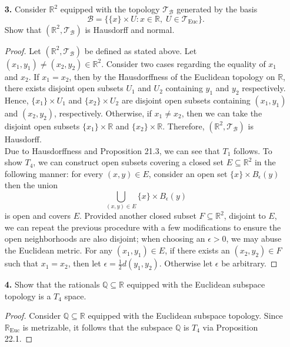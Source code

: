 \documentclass[ 12pt ]{article}
\begin{document}
\begin{enumerate}
	\item[\textbf{3.}] Consider $\mathbb{R}^2$ equipped with the topology $\mathcal{T}_\mathcal{B}$ generated by the basis $$\mathcal{B} = \{ \{ x \} \times U : x \in \mathbb{R},\; U \in
		\mathcal{T}_\mathrm{Euc} \}.$$ Show that $(\mathbb{R}^2, \mathcal{T}_\mathcal{B})$ is Hausdorff and normal.

		\begin{proof}
			Let $(\mathbb{R}^2, \mathcal{T}_\mathcal{B})$ be defined as stated above. Let $(x_1, y_1) \neq (x_2, y_2) \in \mathbb{R}^2$. Consider two cases regarding the equality of $x_1$
			and $x_2$. If $x_1 = x_2$, then by the Hausdorffness of the Euclidean topology on $\mathbb{R}$, there exists disjoint open subsets $U_1$ and $U_2$ containing $y_1$ and $y_2$
			respectively. Hence, $\{ x_1 \} \times U_1$ and $\{ x_2 \} \times U_2$ are disjoint open subsets containing $(x_1, y_1)$ and $(x_2, y_2)$, respectively. Otherwise, if $x_1
			\neq x_2$, then we can take the disjoint open subsets $\{ x_1 \} \times \mathbb{R}$ and $\{ x_2 \} \times \mathbb{R}$. Therefore, $(\mathbb{R}^2, \mathcal{T}_\mathcal{B})$
			is Hausdorff. \\

			Due to Hausdorffness and Proposition 21.3, we can see that $T_1$ follows. To show $T_4$, we can construct open subsets covering a closed set $E \subseteq \mathbb{R}^2$ in the
			following manner: for every $(x, y) \in E$, consider an open set $\{ x \} \times B_\epsilon(y)$ then the union $$\bigcup_{(x, y) \in E} \{ x \} \times B_\epsilon(y)$$ is open
			and covers $E$. Provided another closed subset $F \subseteq \mathbb{R}^2$, disjoint to $E$, we can repeat the previous procedure with a few modifications to ensure the open
			neighborhoods are also disjoint; when choosing an $\epsilon > 0$, we may abuse the Euclidean metric. For any $(x_1, y_1) \in E$, if there exists an $(x_2, y_2) \in F$ such that
			$x_1 = x_2$, then let $\epsilon = \frac{1}{2}d(y_1, y_2)$. Otherwise let $\epsilon$ be arbitrary.
		\end{proof}


	\item[\textbf{4.}] Show that the rationals $\mathbb{Q} \subseteq \mathbb{R}$ equipped with the Euclidean subspace topology is a $T_4$ space.

		\begin{proof}
			Consider $\mathbb{Q} \subseteq \mathbb{R}$ equipped with the Euclidean subspace topology. Since $\mathbb{R}_\mathrm{Euc}$ is metrizable, it follows that the subspace
			$\mathbb{Q}$ is $T_4$ via Proposition 22.1.
		\end{proof}



\end{enumerate}
\end{document}
